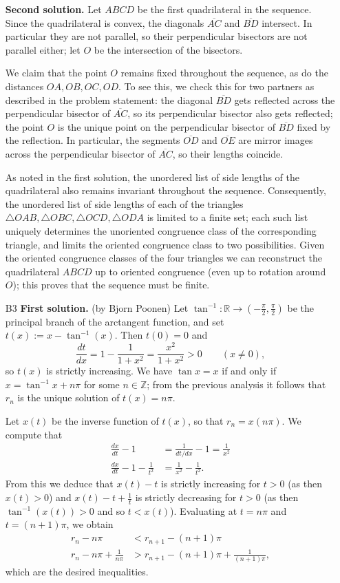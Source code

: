 \documentclass[amssymb,twocolumn,pra,10pt,aps]{revtex4-1}
\newcommand{\RR}{\mathbb{R}}
\begin{document}
\begin{itemize}
\noindent
\textbf{Second solution.}
Let $ABCD$ be the first quadrilateral in the sequence.
Since the quadrilateral is convex, the diagonals $\overline{AC}$ and $\overline{BD}$ intersect. In particular they are not parallel, so their perpendicular bisectors are not parallel either; let $O$ be the intersection
of the bisectors.

We claim that the point $O$ remains fixed throughout the sequence, as do the distances $OA, OB, OC, OD$. To see this, we check this for two partners as described in the problem statement: the diagonal $\overline{BD}$ gets reflected across the perpendicular bisector of $\overline{AC}$, so its perpendicular bisector also gets reflected; the point $O$ is the unique point on the perpendicular bisector of $\overline{BD}$ fixed by the reflection. In particular, the segments $\overline{OD}$ and $\overline{OE}$ are mirror images across the perpendicular bisector of $\overline{AC}$, so their lengths coincide.

As noted in the first solution, the unordered list of side lengths of the quadrilateral also remains invariant throughout the sequence. Consequently, the unordered list of side lengths of each of the triangles $\triangle OAB, \triangle OBC, \triangle OCD, \triangle ODA$ is limited to a finite set;
each such list uniquely determines the unoriented congruence class of the corresponding triangle,
and limits the oriented congruence class to two possibilities. Given the oriented congruence classes of the four triangles we can reconstruct the quadrilateral $ABCD$ up to oriented congruence (even up to rotation around $O$); this proves that the sequence must be finite.

\item[B3]
\noindent
\textbf{First solution.} (by Bjorn Poonen)
Let $\tan^{-1} \colon \RR \to (-\frac{\pi}{2}, \frac{\pi}{2})$ be the principal branch of the arctangent function, and set $t(x) := x - \tan^{-1}(x)$. Then $t(0) = 0$ and
\[
\frac{dt}{dx} = 1 - \frac{1}{1+x^2} = \frac{x^2}{1+x^2} > 0 \qquad (x \neq 0),
\]
so $t(x)$ is strictly increasing.
We have $\tan x = x$ if and only if $x = \tan^{-1} x + n\pi$ for some $n \in \mathbb{Z}$;
from the previous analysis it follows that $r_n$ is the unique solution of $t(x) = n \pi$.

Let $x(t)$ be the inverse function of $t(x)$, so that $r_n = x(n\pi)$. We compute that
\begin{align*}
\frac{dx}{dt} - 1 &= \frac{1}{dt/dx} - 1 = \frac{1}{x^2} \\
\frac{dx}{dt} - 1 - \frac{1}{t^2} &= \frac{1}{x^2} - \frac{1}{t^2}.
\end{align*}
From this we deduce that $x(t) - t$ is strictly increasing for $t > 0$ (as then $x(t) > 0$)
and $x(t) - t + \frac{1}{t}$ is strictly decreasing for $t > 0$ (as then $\tan^{-1}(x(t)) > 0$ and so $t < x(t)$).  Evaluating at $t = n\pi$ and $t = (n+1)\pi$, we obtain 
\begin{align*}
r_n - n\pi &< r_{n+1} - (n+1) \pi \\
r_n - n\pi + \frac{1}{n\pi} &> r_{n+1} - (n+1)\pi + \frac{1}{(n+1)\pi},
\end{align*}
which are the desired inequalities.


\end{itemize}
\end{document}
